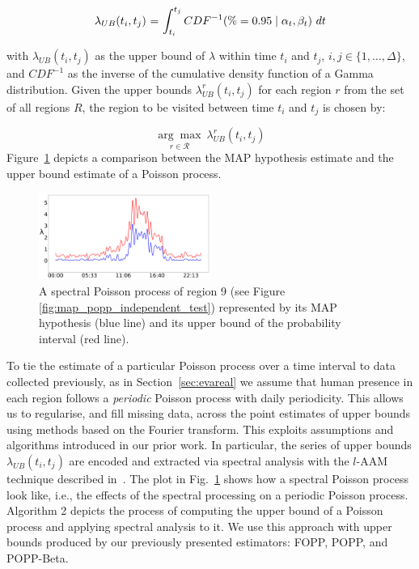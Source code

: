\begin{equation}
	\label{eq:upper_bound_exploration}
	\begin{tabular}{r@{ = }l}
	$\lambda_{UB}(t_i, t_j)$ & $\displaystyle \int_{t_i}^{t_j} CDF^{-1}(\% = 0.95 \mid \alpha_t, \beta_t)~dt$\\ [1ex]
	\end{tabular}
\end{equation}

\noindent with $\lambda_{UB}(t_i, t_j)$ as the upper bound of $\lambda$ within time $t_i$ and $t_j$, $i, j \in \{1, \ldots, \Delta\}$, and $CDF^{-1}$ as the inverse of the cumulative density function of a Gamma distribution. Given the upper bounds $\lambda^{r}_{UB}(t_i, t_j)$ for each region $r$ from the set of all regions $R$, the region to be visited between time $t_i$ and $t_j$ is chosen by:

\begin{equation}
\label{eq:choosing_place}
\underset{r \in \mathcal R}{\arg\max}~\lambda^{r}_{UB}(t_i, t_j)
\end{equation}
\noindent Figure~\ref{fig:map_vs_ub} depicts a comparison between the MAP hypothesis estimate and the upper bound estimate of a Poisson process.

\begin{figure}[t!]
	\centering
	\includegraphics[width=0.5\textwidth]{./figures/map_vs_ub.png}
	\caption{A spectral Poisson process of region 9 (see Figure \ref{fig:map_popp_independent_test}) represented by its MAP hypothesis (blue line) and its upper bound of the probability interval (red line).}
	\label{fig:map_vs_ub}
\end{figure}


To tie the estimate of a particular Poisson process over a time interval to data collected previously, as in Section~\ref{sec:evareal} we assume that human presence in each region follows a \emph{periodic} Poisson process with daily periodicity. This allows us to regularise, and fill missing data, across the point estimates of upper bounds using methods based on the Fourier transform.  This exploits assumptions and algorithms introduced in our prior work. In particular, the series of upper bounds $\lambda_{UB}(t_i, t_j)$ are encoded and extracted via spectral analysis with the $l$-AAM technique described in~\cite{jovan_iros16}. The plot in Fig.~\ref{fig:map_vs_ub} shows how a spectral Poisson process look like, i.e., the effects of the spectral processing on a periodic Poisson process. Algorithm 2 depicts the process of computing the upper bound of a Poisson process and applying spectral analysis to it. We use this approach with upper bounds produced by our previously presented estimators: FOPP, POPP, and POPP-Beta. 

